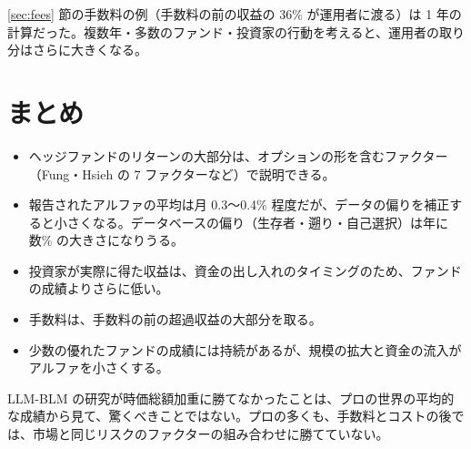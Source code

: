 \ref{sec:fees} 節の手数料の例（手数料の前の収益の 36\% が運用者に渡る）は 1 年の計算だった。複数年・多数のファンド・投資家の行動を考えると、運用者の取り分はさらに大きくなる。

\section{まとめ}

\begin{keybox}[ヘッジファンドの成績について確立していること]
\begin{itemize}
\item ヘッジファンドのリターンの大部分は、オプションの形を含むファクター（Fung・Hsieh の 7 ファクターなど）で説明できる。
\item 報告されたアルファの平均は月 0.3〜0.4\% 程度だが、データの偏りを補正すると小さくなる。データベースの偏り（生存者・遡り・自己選択）は年に数\% の大きさになりうる。
\item 投資家が実際に得た収益は、資金の出し入れのタイミングのため、ファンドの成績よりさらに低い。
\item 手数料は、手数料の前の超過収益の大部分を取る。
\item 少数の優れたファンドの成績には持続があるが、規模の拡大と資金の流入がアルファを小さくする。
\end{itemize}
\end{keybox}

LLM-BLM の研究が時価総額加重に勝てなかったことは、プロの世界の平均的な成績から見て、驚くべきことではない。プロの多くも、手数料とコストの後では、市場と同じリスクのファクターの組み合わせに勝てていない。
